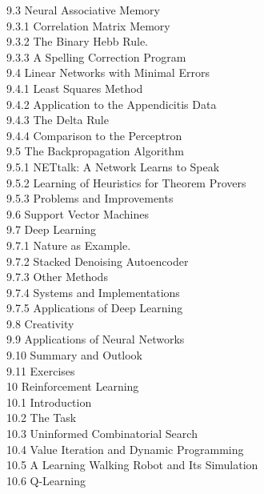 \documentclass[10pt]{book}
\begin{document}
9.3 Neural Associative Memory \\
9.3.1 Correlation Matrix Memory \\
9.3.2 The Binary Hebb Rule. \\
9.3.3 A Spelling Correction Program \\
9.4 Linear Networks with Minimal Errors \\
9.4.1 Least Squares Method \\
9.4.2 Application to the Appendicitis Data \\
9.4.3 The Delta Rule \\
9.4.4 Comparison to the Perceptron \\
9.5 The Backpropagation Algorithm \\
9.5.1 NETtalk: A Network Learns to Speak \\
9.5.2 Learning of Heuristics for Theorem Provers \\
9.5.3 Problems and Improvements \\
9.6 Support Vector Machines \\
9.7 Deep Learning \\
9.7.1 Nature as Example. \\
9.7.2 Stacked Denoising Autoencoder \\
9.7.3 Other Methods \\
9.7.4 Systems and Implementations \\
9.7.5 Applications of Deep Learning \\
9.8 Creativity \\
9.9 Applications of Neural Networks \\
9.10 Summary and Outlook \\
9.11 Exercises \\
10 Reinforcement Learning \\
10.1 Introduction \\
10.2 The Task \\
10.3 Uninformed Combinatorial Search \\
10.4 Value Iteration and Dynamic Programming \\
10.5 A Learning Walking Robot and Its Simulation \\
10.6 Q-Learning \\
\end{document}
